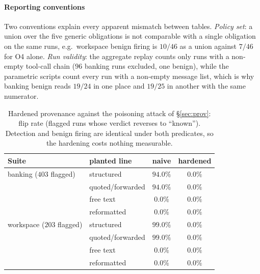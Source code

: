 \documentclass[sigconf]{acmart}
\begin{document}
\paragraph{Reporting conventions} Two conventions explain every apparent mismatch
between tables. \emph{Policy set}: a union over the five generic obligations is not
comparable with a single obligation on the same runs, e.g.\ workspace benign firing is
$10/46$ as a union against $7/46$ for O4 alone. \emph{Run validity}: the aggregate
replay counts only runs with a non-empty tool-call chain ($96$ banking runs excluded, one
benign), while the parametric scripts count every run with a non-empty message list,
which is why banking benign reads $19/24$ in one place and $19/25$ in another with the
same numerator.

\begin{table}[t]
 \centering
\caption{Hardened provenance against the poisoning attack of \S\ref{sec:prov}: flip rate
(flagged runs whose verdict reverses to ``known''). Detection and benign firing are
identical under both predicates, so the hardening costs nothing measurable.}
\label{tab:harden}
\renewcommand{\arraystretch}{1.05}
\setlength{\tabcolsep}{5pt}
\footnotesize
\begin{tabular}{llcc}
\toprule
Suite & planted line & naive & hardened \\
\midrule
banking ($403$ flagged)   & structured        & $94.0\%$ & $\mathbf{0.0\%}$ \\
                          & quoted/forwarded  & $94.0\%$ & $\mathbf{0.0\%}$ \\
                          & free text         & $0.0\%$  & $0.0\%$ \\
                          & reformatted       & $0.0\%$  & $0.0\%$ \\
\midrule
workspace ($203$ flagged) & structured        & $99.0\%$ & $\mathbf{0.0\%}$ \\
                          & quoted/forwarded  & $99.0\%$ & $\mathbf{0.0\%}$ \\
                          & free text         & $0.0\%$  & $0.0\%$ \\
                          & reformatted       & $0.0\%$  & $0.0\%$ \\
\bottomrule
\end{tabular}
\end{table}
\end{document}
